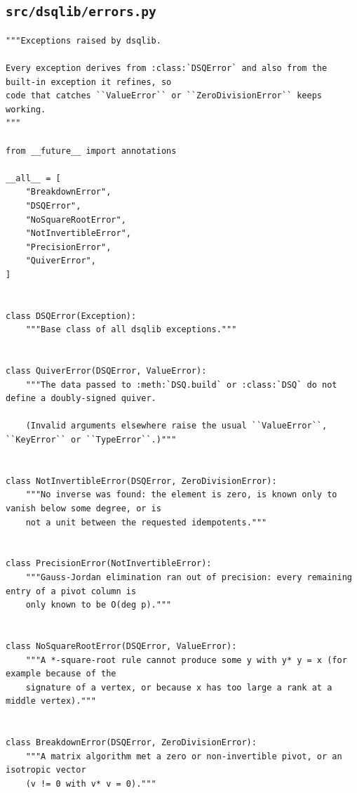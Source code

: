 \documentclass[12pt, a4paper]{report}
\theoremstyle{plain}
\theoremstyle{definition}
\theoremstyle{remark}
\theoremstyle{plain}
\begin{document}
\subsection{\texorpdfstring{\texttt{src/dsqlib/errors.py}}{src/dsqlib/errors.py}}
\begin{lstlisting}[style=dsqcode]
"""Exceptions raised by dsqlib.

Every exception derives from :class:`DSQError` and also from the built-in exception it refines, so
code that catches ``ValueError`` or ``ZeroDivisionError`` keeps working.
"""

from __future__ import annotations

__all__ = [
    "BreakdownError",
    "DSQError",
    "NoSquareRootError",
    "NotInvertibleError",
    "PrecisionError",
    "QuiverError",
]


class DSQError(Exception):
    """Base class of all dsqlib exceptions."""


class QuiverError(DSQError, ValueError):
    """The data passed to :meth:`DSQ.build` or :class:`DSQ` do not define a doubly-signed quiver.

    (Invalid arguments elsewhere raise the usual ``ValueError``, ``KeyError`` or ``TypeError``.)"""


class NotInvertibleError(DSQError, ZeroDivisionError):
    """No inverse was found: the element is zero, is known only to vanish below some degree, or is
    not a unit between the requested idempotents."""


class PrecisionError(NotInvertibleError):
    """Gauss-Jordan elimination ran out of precision: every remaining entry of a pivot column is
    only known to be O(deg p)."""


class NoSquareRootError(DSQError, ValueError):
    """A *-square-root rule cannot produce some y with y* y = x (for example because of the
    signature of a vertex, or because x has too large a rank at a middle vertex)."""


class BreakdownError(DSQError, ZeroDivisionError):
    """A matrix algorithm met a zero or non-invertible pivot, or an isotropic vector
    (v != 0 with v* v = 0)."""
\end{lstlisting}



\end{document}
